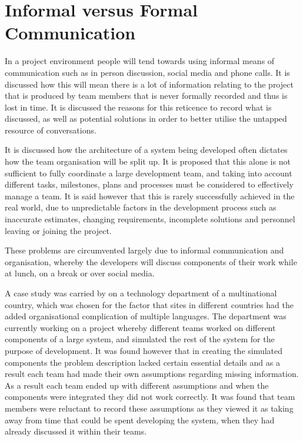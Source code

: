 \documentclass{l4proj}
\begin{document}
\section {Informal versus Formal Communication}

In a project environment people will tend towards using informal means of communication such as in person discussion, social media and phone calls.  It is discussed how this will mean there is a lot of information relating to the project that is produced by team members that is never formally recorded and thus is lost in time.  It is discussed the reasons for this reticence to record what is discussed, as well as potential solutions in order to better utilise the untapped resource of conversations.

It is discussed how the architecture of a system being developed often dictates how the team organisation will be split up.  It is proposed that this alone is not sufficient to fully coordinate a large development team, and taking into account different tasks, milestones, plans and processes must be considered to effectively manage a team.  It is said however that this is rarely successfully achieved in the real world, due to unpredictable factors in the development process such as inaccurate estimates, changing requirements, incomplete solutions and personnel leaving or joining the project.  

These problems are circumvented largely due to informal communication and organisation, whereby the developers will discuss components of their work while at lunch, on a break or over social media.

A case study was carried by \citet{herbsleb99architectures} on a technology department of a multinational country, which was chosen for the factor that sites in different countries had the added organisational complication of multiple languages.  The department was currently working on a project whereby different teams worked on different components of a large system, and simulated the rest of the system for the purpose of development.  It was found however that in creating the simulated components the problem description lacked certain essential details and as a result each team had made their own assumptions regarding missing information.  As a result each team ended up with different assumptions and when the components were integrated they did not work correctly.  It was found that team members were reluctant to record these assumptions as they viewed it as taking away from time that could be spent developing the system, when they had already discussed it within their teams.
\end{document}
